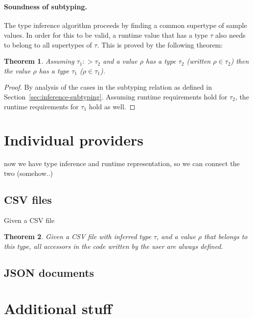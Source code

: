 \documentclass[10pt]{sigplanconf}
\newtheorem{theorem}{Theorem}
\begin{document}
~

\paragraph{Soundness of subtyping.}
The type inference algorithm proceeds by finding a common supertype of sample values. In order for
this to be valid, a runtime value that has a type $\tau$ also needs to belong to all supertypes of
$\tau$. This is proved by the following theorem:

\begin{theorem}
Assuming $\tau_1 :> \tau_2$ and a value $\rho$ has a type $\tau_2$ 
(written $\rho \in \tau_2$) then the value $\rho$ has a type $\tau_1$
($\rho \in \tau_1$).
\end{theorem}
\begin{proof}
By analysis of the cases in the subtyping relation as defined in Section~\ref{sec:inference-subtyping}.
Assuming runtime requirements hold for $\tau_2$, the runtime requirements for $\tau_1$ hold as well.
\end{proof}


\section{Individual providers}
\label{sec:providers}

now we have type inference and runtime representation, so we can connect the two (somehow..)

\subsection{CSV files}
Given a CSV file

\begin{theorem}
Given a CSV file with inferred type $\tau$, and a value $\rho$ that belongs to this type,
all accessors in the code written by the user are always defined.
\end{theorem}

\subsection{JSON documents}

\section{Additional stuff}
\end{document}
